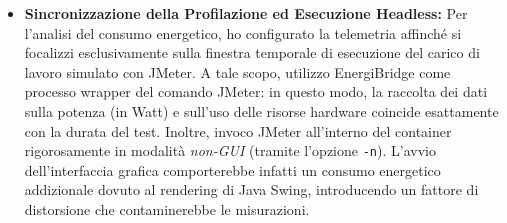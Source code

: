 \begin{itemize}
    \item \textbf{Sincronizzazione della Profilazione ed Esecuzione Headless:} Per l'analisi del consumo energetico, ho configurato la telemetria affinché si focalizzi esclusivamente sulla finestra temporale di esecuzione del carico di lavoro simulato con JMeter. A tale scopo, utilizzo EnergiBridge come processo wrapper del comando JMeter: in questo modo, la raccolta dei dati sulla potenza (in Watt) e sull'uso delle risorse hardware coincide esattamente con la durata del test. Inoltre, invoco JMeter all'interno del container rigorosamente in modalità \textit{non-GUI} (tramite l'opzione \texttt{-n}). L'avvio dell'interfaccia grafica comporterebbe infatti un consumo energetico addizionale dovuto al rendering di Java Swing, introducendo un fattore di distorsione che contaminerebbe le misurazioni.
    

\end{itemize}
